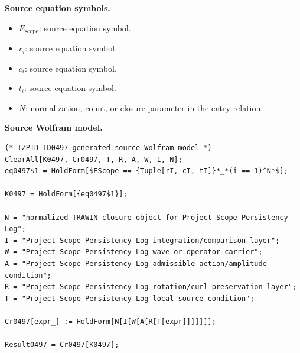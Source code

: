 \begin{minipage}[t]{0.49\linewidth}
\begingroup
\small
\raggedright
\textbf{Source equation symbols.}\par
\begin{itemize}[leftmargin=1.35em,itemsep=1pt,topsep=1pt,parsep=0pt]
    \item $E_{\mathrm{scope}}$: source equation symbol.
    \item $r_i$: source equation symbol.
    \item $c_i$: source equation symbol.
    \item $t_i$: source equation symbol.
    \item $N$: normalization, count, or closure parameter in the entry relation.
\end{itemize}
\endgroup
\end{minipage}\hfill
\begin{minipage}[t]{0.47\linewidth}
\begingroup
\scriptsize
\raggedright
\textbf{Source Wolfram model.}\par
\begin{Verbatim}[fontsize=\tiny,breaklines=true,breakanywhere=true]
(* TZPID ID0497 generated source Wolfram model *)
ClearAll[K0497, Cr0497, T, R, A, W, I, N];
eq0497$1 = HoldForm[$EScope == {Tuple[rI, cI, tI]}*_*(i == 1)^N*$];

K0497 = HoldForm[{eq0497$1}];

N = "normalized TRAWIN closure object for Project Scope Persistency Log";
I = "Project Scope Persistency Log integration/comparison layer";
W = "Project Scope Persistency Log wave or operator carrier";
A = "Project Scope Persistency Log admissible action/amplitude condition";
R = "Project Scope Persistency Log rotation/curl preservation layer";
T = "Project Scope Persistency Log local source condition";

Cr0497[expr_] := HoldForm[N[I[W[A[R[T[expr]]]]]]];

Result0497 = Cr0497[K0497];
\end{Verbatim}
\endgroup
\end{minipage}

